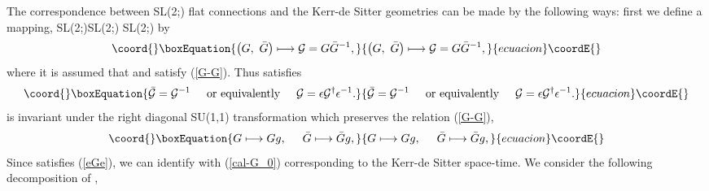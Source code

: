 \documentclass[a4paper,11pt]{article}
\begin{document}
The correspondence between SL(2;\coordHE{}) flat connections and 
the Kerr-de Sitter geometries can be made by the following ways:
first we define a mapping, 
SL(2;\coordHE{})\myHighlight{$\times$}\coordHE{}SL(2;\coordHE{})
    \myHighlight{$\longrightarrow$}\coordHE{}SL(2;\coordHE{})
by
\begin{equation}\coord{}\boxEquation{
\left(G, \ \bar{G}\right)  \longmapsto {\cal G}=G\bar{G}^{-1},
}{
\left(G, \ \bar{G}\right)  \longmapsto {\cal G}=G\bar{G}^{-1},
}{ecuacion}\coordE{}\end{equation}
where it is assumed that \coordHE{} and \coordHE{} satisfy (\ref{G-G}).
Thus \coordHE{} satisfies 
\begin{equation}\coord{}\boxEquation{
\label{eGe}
\bar{{\cal G}}={\cal G}^{-1} 
 \hspace{5mm} \mbox{or equivalently} \hspace{5mm} 
   {\cal G}=\epsilon {\cal G}^\dagger\epsilon^{-1}.
}{
\bar{{\cal G}}={\cal G}^{-1} 
 \hspace{5mm} \mbox{or equivalently} \hspace{5mm} 
   {\cal G}=\epsilon {\cal G}^\dagger\epsilon^{-1}.
}{ecuacion}\coordE{}\end{equation}
\coordHE{} is invariant under the right diagonal SU(1,1) transformation 
which preserves the relation (\ref{G-G}), 
\begin{equation}\coord{}\boxEquation{
\label{pairing}
G \longmapsto Gg, \hspace{5mm} \bar{G} \longmapsto \bar{G}g, 
}{
G \longmapsto Gg, \hspace{5mm} \bar{G} \longmapsto \bar{G}g, 
}{ecuacion}\coordE{}\end{equation}
Since \coordHE{} satisfies (\ref{eGe}), we can identify \coordHE{} with 
\coordHE{} (\ref{cal-G_0}) corresponding to the Kerr-de Sitter space-time.
We consider the following decomposition of \coordHE{}, 
\end{document}
